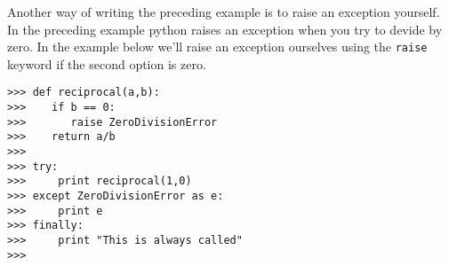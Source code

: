 \documentclass[letterpaper,11pt]{article}
\begin{document}
\par{Another way of writing the preceding example is to raise an exception
yourself. In the preceding example python raises an exception when you try to
devide by zero. In the example below we'll raise an exception ourselves using
the \texttt{raise} keyword if the second option is zero. }
\\
\begin{minipage}{.75\textwidth}
    \begin{tcolorbox}
        \begin{footnotesize}
            \begin{verbatim}
>>> def reciprocal(a,b):
>>>    if b == 0:
>>>       raise ZeroDivisionError
>>>    return a/b
>>>
>>> try: 
>>>     print reciprocal(1,0)
>>> except ZeroDivisionError as e:
>>>     print e
>>> finally:
>>>     print "This is always called"
>>> 

            \end{verbatim}
        \end{footnotesize}
    \end{tcolorbox}
\end{minipage}
\end{document}

